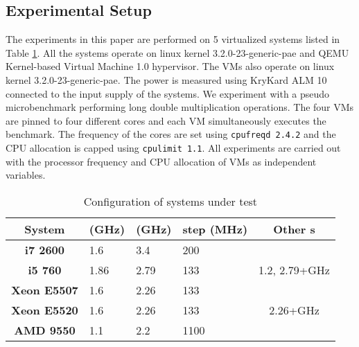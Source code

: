 \documentclass{sig-alternate}
\begin{document}
\subsection{Experimental Setup}\label{expW}
The experiments in this paper are performed on 5 virtualized systems listed in Table \ref{tab:sys}. All the systems operate on linux kernel 3.2.0-23-generic-pae and QEMU Kernel-based Virtual Machine 1.0 hypervisor. The VMs also operate on linux kernel 3.2.0-23-generic-pae. The power is measured using KryKard ALM 10 \cite{ALM10} connected to the input supply of the systems. We experiment with a pseudo microbenchmark performing long double multiplication operations. The four VMs are pinned to four different cores and each VM simultaneously executes the benchmark. The frequency of the cores are set using \texttt{cpufreqd 2.4.2} and the CPU allocation is capped using \texttt{cpulimit 1.1}. All experiments are carried out with the processor frequency and CPU allocation of VMs as independent variables. 
\begin{table}[!htbp]
\vspace{-0.5cm}
\caption{Configuration of systems under test}
\begin{center}
\begin{tabular}{|c|p{0.8cm}|p{0.8cm}|p{1cm}|c|}
\hline
\textbf{System}	&	 (GHz)	&	 (GHz)	&	 step (MHz)	&	Other s	\\	\hline
\textbf{i7 2600}	&	1.6	&	3.4	&	200	&		\\	\hline
\textbf{i5 760}	&	1.86	&	2.79	&	133	&	1.2, 2.79+GHz	\\	\hline
\textbf{Xeon E5507}	&	1.6	&	2.26	&	133	&		\\	\hline
\textbf{Xeon E5520}	&	1.6	&	2.26	&	133	&	2.26+GHz	\\	\hline
\textbf{AMD 9550}	&	1.1	&	2.2	&	1100	&		\\	\hline
\end{tabular}
\label{tab:sys}
\end{center}
\vspace{-0.5cm}
\end{table}
\end{document}
